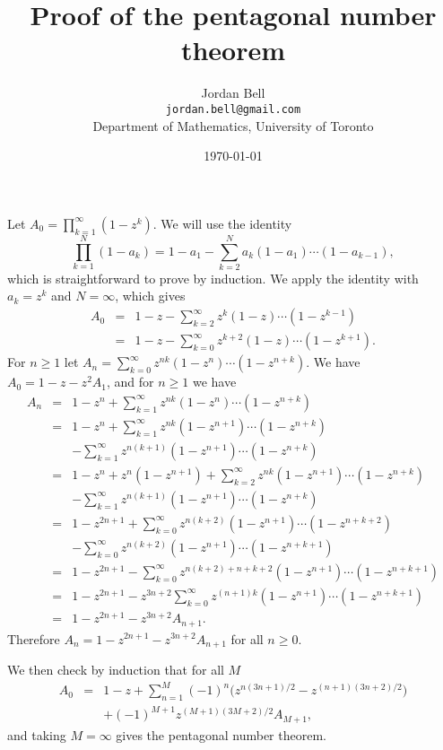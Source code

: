 \documentclass{article}
\begin{document}
\title{Proof of the pentagonal number theorem}
\author{Jordan Bell\\ \texttt{jordan.bell@gmail.com}\\Department of Mathematics, University of Toronto}
\date{\today}
\maketitle

Let $A_0=\prod_{k=1}^\infty (1-z^k)$. We will use the identity
\[
\prod_{k=1}^N (1-a_k) = 1- a_1 - \sum_{k=2}^N a_k(1-a_1)\cdots(1-a_{k-1}),
\]
which 
is straightforward to prove by induction. We apply the identity with $a_k=z^k$ and $N=\infty$, which gives
\begin{eqnarray*}
A_0&=&1-z-\sum_{k=2}^\infty z^k(1-z)\cdots(1-z^{k-1})\\
&=&1-z-\sum_{k=0}^\infty z^{k+2}(1-z)\cdots(1-z^{k+1}).
\end{eqnarray*}
For $n \geq 1$ let
$A_n=\sum_{k=0}^\infty z^{nk}(1-z^n)\cdots (1-z^{n+k})$. We have
$A_0=1-z-z^2A_1$, and for $n \geq 1$ we have
\begin{eqnarray*}
A_n&=&1-z^n+\sum_{k=1}^\infty z^{nk}(1-z^n)\cdots(1-z^{n+k})\\
&=&1-z^n+\sum_{k=1}^\infty z^{nk}(1-z^{n+1})\cdots(1-z^{n+k})\\
&&-\sum_{k=1}^\infty z^{n(k+1)}(1-z^{n+1})\cdots(1-z^{n+k})\\
&=&1-z^n+z^n(1-z^{n+1})+\sum_{k=2}^\infty z^{nk}(1-z^{n+1})\cdots(1-z^{n+k})\\
&&-\sum_{k=1}^\infty z^{n(k+1)}(1-z^{n+1})\cdots(1-z^{n+k})\\
&=&1-z^{2n+1}+\sum_{k=0}^\infty z^{n(k+2)}(1-z^{n+1})\cdots(1-z^{n+k+2})\\
&&-\sum_{k=0}^\infty z^{n(k+2)}(1-z^{n+1})\cdots(1-z^{n+k+1})\\
&=&1-z^{2n+1}-\sum_{k=0}^\infty z^{n(k+2)+n+k+2} (1-z^{n+1})\cdots (1-z^{n+k+1})\\
&=&1-z^{2n+1}-z^{3n+2}\sum_{k=0}^\infty z^{(n+1)k}(1-z^{n+1})\cdots(1-z^{n+k+1})\\
&=&1-z^{2n+1}-z^{3n+2}A_{n+1}.
\end{eqnarray*}
Therefore $A_n=1-z^{2n+1}-z^{3n+2}A_{n+1}$ for all $n \geq 0$.

We then check by induction that for all $M$
\begin{eqnarray*}
A_0&=&1-z+\sum_{n=1}^M (-1)^n \Big( z^{n(3n+1)/2}-z^{(n+1)(3n+2)/2} \Big)\\
&&+(-1)^{M+1} z^{(M+1)(3M+2)/2}A_{M+1},
\end{eqnarray*}
and taking $M=\infty$ gives the pentagonal number theorem.
\end{document}
